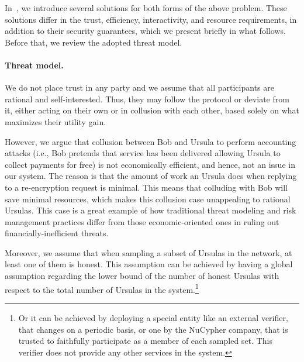 \documentclass{llncs}
\begin{document}
 In~\cite{confirm-activity-draft}, we introduce several solutions for both forms of the above problem. These solutions differ in the trust, efficiency, interactivity, and resource requirements, in addition to their security guarantees, which we present briefly in what follows. Before that, we review the adopted threat model.


\paragraph{Threat model.} We do not place trust in any party and we assume that all participants are rational and self-interested. Thus, they may follow the protocol or deviate from it, either acting on their own or in collusion with each other, based solely on what maximizes their utility gain. 


However, we argue that collusion between Bob and Ursula to perform accounting attacks (i.e., Bob pretends that service has been delivered allowing Ursula to collect payments for free) is not economically efficient, and hence, not an issue in our system. The reason is that the amount of work an Ursula does when replying to a re-encryption request is minimal. This means that colluding with Bob will save minimal resources, which makes this collusion case unappealing to rational Ursulas. This case is a great example of how traditional threat modeling and risk management practices differ from those economic-oriented ones in ruling out financially-inefficient threats.


Moreover, we assume that when sampling a subset of Ursulas in the network, at least one of them is honest. This assumption can be achieved by having a global assumption regarding the lower bound of the number of 
honest Ursulas with respect to the total number of Ursulas in the system.\footnote{Or it can be achieved by deploying a special entity like an external verifier, that changes on a periodic basis, or one by the NuCypher company, that is trusted to faithfully participate as a member of each sampled set. This verifier does not provide any other services in the system.}
\end{document}
